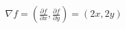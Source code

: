 \documentclass[preview]{standalone}
\begin{document}
\begin{align*}
\nabla f = \left( \frac{\partial f}{\partial x}, \frac{\partial f}{\partial y} \right) = (2x, 2y)
\end{align*}
\end{document}
